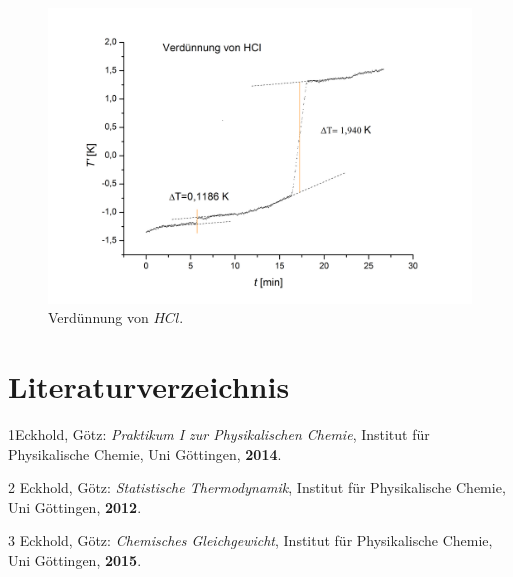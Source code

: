 \documentclass[12pt,a4paper,titlepage,headinclude,bibtotoc]{scrartcl}
\begin{document}
\begin{figure}[h]\label{Verduennung}
\centering
\includegraphics[width=13.5cm]{Verduennungsenthalpie.png}
\caption{Verdünnung von $HCl$.}
\end{figure} 
\FloatBarrier




\section{Literaturverzeichnis}
1\quad Eckhold, Götz: \emph{Praktikum I zur Physikalischen Chemie}, Institut für Physikalische Chemie, Uni Göttingen, \textbf{2014}.
\vspace{0,5 cm}

2 \quad Eckhold, Götz: \emph{Statistische Thermodynamik}, Institut für Physikalische Chemie, Uni Göttingen, \textbf{2012}.

\vspace{0,5cm}

3 \quad Eckhold, Götz: \emph{Chemisches Gleichgewicht}, Institut für Physikalische Chemie, Uni Göttingen, \textbf{2015}.\\
\end{document}
